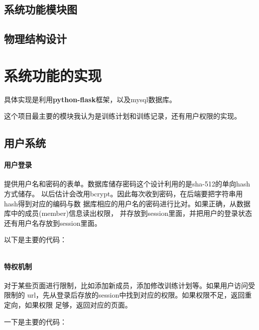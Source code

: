 \subsection{系统功能模块图}


\subsection{物理结构设计}


\section{系统功能的实现}
具体实现是利用\textbf{python-flask}框架，以及mysql数据库。

这个项目最主要的模块我认为是训练计划和训练记录，还有用户权限的实现。

\subsection{用户系统}
\paragraph{用户登录}
提供用户名和密码的表单。数据库储存密码这个设计利用的是sha-512的单向hash方式储存。
以后估计会改用bcrypt。因此每次收到密码，在后端要把字符串用hash得到对应的编码与数
据库相应的用户名的密码进行比对。如果正确，从数据库中的成员(member)信息读出权限，
并存放到session里面，并把用户的登录状态还有用户名存放到session里面。

\vspace{3em}
以下是主要的代码：
\begin{Verbatim}[]

\end{Verbatim}

\vspace{3em}
\paragraph{特权机制}
对于某些页面进行限制，比如添加新成员，添加修改训练计划等。如果用户访问受限制的
url，先从登录后存放的session中找到对应的权限。如果权限不足，返回重定向，如果权限
足够，返回对应的页面。

\vspace{3em}
一下是主要的代码：
\begin{Verbatim}[]

\end{Verbatim}

